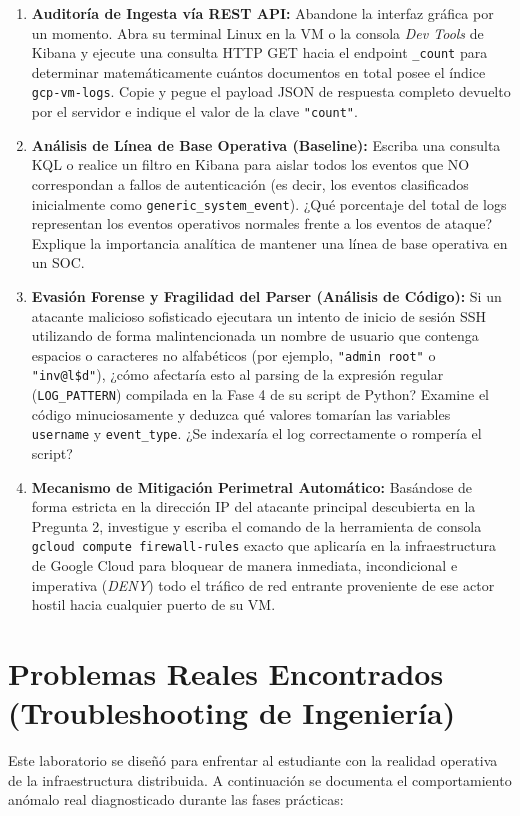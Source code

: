 \documentclass[
  coursetitle={Cómputo Nube y Tecnologías Emergentes},
  coursehours={96},
  coursedate={Verano 2026},
  doctype={Guía de Laboratorio Práctico},
  otherlangs={english,french},
  authorname={Lázaro},
  authorsurname={Bustio-Martínez},
  authortitle={PhD},
  role={Profesor Investigador},
  email={lbustio@inaoe.mx},
  phone={5559504000},
  ext={7459},
  institution={Instituto Nacional de Astrofísica, Óptica y Electrónica (INAOE)},
  department={Maestría en Ciencias en Tecnologías de Seguridad},
  address={Luis Enrique Erro 1, Sta. Ma. Tonantzintla, San Andrés Cholula, CP 72840, Puebla, México},
  margin={0.5in}
]{../../lbustio_lecture_notes}
\begin{document}
\begin{enumerate}
    \item \textbf{Auditoría de Ingesta vía REST API:} Abandone la interfaz gráfica por un momento. Abra su terminal Linux en la VM o la consola \textit{Dev Tools} de Kibana y ejecute una consulta HTTP GET hacia el endpoint \texttt{\_count} para determinar matemáticamente cuántos documentos en total posee el índice \texttt{gcp-vm-logs}. Copie y pegue el payload JSON de respuesta completo devuelto por el servidor e indique el valor de la clave \texttt{"count"}.
    
    \item \textbf{Análisis de Línea de Base Operativa (Baseline):} Escriba una consulta KQL o realice un filtro en Kibana para aislar todos los eventos que NO correspondan a fallos de autenticación (es decir, los eventos clasificados inicialmente como \texttt{generic\_system\_event}). ¿Qué porcentaje del total de logs representan los eventos operativos normales frente a los eventos de ataque? Explique la importancia analítica de mantener una línea de base operativa en un SOC.
    
    \item \textbf{Evasión Forense y Fragilidad del Parser (Análisis de Código):} Si un atacante malicioso sofisticado ejecutara un intento de inicio de sesión SSH utilizando de forma malintencionada un nombre de usuario que contenga espacios o caracteres no alfabéticos (por ejemplo, \texttt{"admin root"} o \texttt{"inv@l\$d"}), ¿cómo afectaría esto al parsing de la expresión regular (\texttt{LOG\_PATTERN}) compilada en la Fase 4 de su script de Python? Examine el código minuciosamente y deduzca qué valores tomarían las variables \texttt{username} y \texttt{event\_type}. ¿Se indexaría el log correctamente o rompería el script?
    
    \item \textbf{Mecanismo de Mitigación Perimetral Automático:} Basándose de forma estricta en la dirección IP del atacante principal descubierta en la Pregunta 2, investigue y escriba el comando de la herramienta de consola \texttt{gcloud compute firewall-rules} exacto que aplicaría en la infraestructura de Google Cloud para bloquear de manera inmediata, incondicional e imperativa (\textit{DENY}) todo el tráfico de red entrante proveniente de ese actor hostil hacia cualquier puerto de su VM.
\end{enumerate}

\section{Problemas Reales Encontrados (Troubleshooting de Ingeniería)}
Este laboratorio se diseñó para enfrentar al estudiante con la realidad operativa de la infraestructura distribuida. A continuación se documenta el comportamiento anómalo real diagnosticado durante las fases prácticas:
\end{document}
